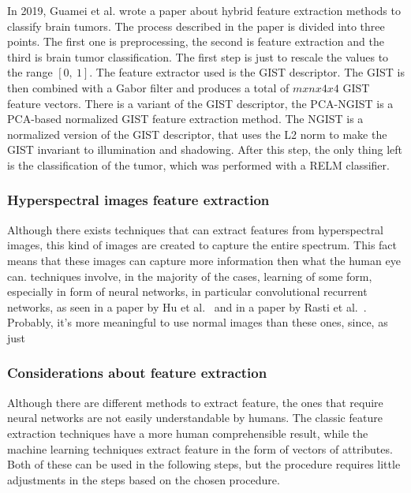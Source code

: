 \documentclass[conference]{IEEEtran}
\begin{document}
				\noindent In 2019, Guamei et al. wrote a paper about hybrid feature extraction methods to classify brain tumors. The process described in the paper is divided into three points. The 
				first one is preprocessing, the second is feature extraction and the third is brain tumor classification. The first step is just to rescale the values to the range $[0,\ 1]$. The feature extractor 
				used is the GIST descriptor. The GIST is then combined with a Gabor filter and produces a total of $mxnx4x4$ GIST feature vectors. There is a variant of the GIST descriptor, the 
				PCA-NGIST is a PCA-based normalized GIST feature extraction method. The NGIST is a normalized version of the GIST descriptor, that uses the L2 norm to make the GIST invariant to illumination and shadowing. 
				After this step, the only thing left is the classification of the tumor, which was performed with a RELM classifier. 
				
			\subsubsection{Hyperspectral images feature extraction}
				
				Although there exists techniques that can extract features from hyperspectral images, this kind of images are created to capture the entire spectrum. This fact means that these images can capture 
				more information then what the human eye can. techniques involve, in the majority of the cases, learning of some form, especially in form of neural networks, in particular convolutional recurrent 
				networks, as seen in a paper by Hu et al.~\cite{8} and in a paper by Rasti et al.~\cite{9}. Probably, it's more meaningful to use normal images than these ones, since, as just 

			\subsubsection{Considerations about feature extraction}
			
				Although there are different methods to extract feature, the ones that require neural networks are not easily understandable by humans. The classic feature extraction techniques have a more 
				human comprehensible result, while the machine learning techniques extract feature in the form of vectors of attributes. Both of these can be used in the following steps, but the procedure requires 
				little adjustments in the steps based on the chosen procedure.
		
\end{document}
